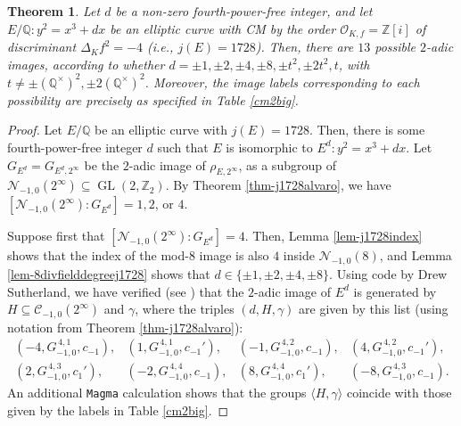 \documentclass[11pt]{amsart}
\newtheorem{thm}[defn]{Theorem}
\theoremstyle{definition}
\newcommand{\Q}{\mathbb Q}
\newcommand{\Z}{\mathbb Z}
\newcommand{\Of}{\mathcal{O}_{K,f}}
\newcommand{\cC}{\mathcal{C}}
\newcommand{\GL}{\operatorname{GL}}
\begin{document}
\begin{thm}\label{j1728ver }\label{thm-j1728}
    Let $d$ be a non-zero fourth-power-free integer, and let $E/\Q: y^2=x^3+dx$ be an elliptic curve with CM by the order $\Of=\Z[i]$ of discriminant $\Delta_K f^2=-4$ (i.e., $j(E)=1728$). Then, there are $13$ possible $2$-adic images, according to whether $d = \pm 1, \pm 2, \pm 4, \pm 8, \pm t^2, \pm 2t^2, t$, with $t\neq \pm (\Q^\times)^2, \pm 2(\Q^\times)^2$. Moreover, the image labels corresponding to each possibility are precisely as specified in Table \ref{cm2big}.
\end{thm}
\begin{proof}
 Let $E/\Q$ be an elliptic curve with $j(E)=1728$. Then, there is some fourth-power-free integer $d$ such that $E$ is isomorphic to  $E^d : y^2=x^3+dx$. Let $G_{E^d}=G_{E^d,2^\infty}$ be the $2$-adic image of $\rho_{E,2^\infty}$, as a subgroup of  $\mathcal{N}_{-1,0}(2^{\infty})\subseteq \GL(2,\Z_2)$. By Theorem \ref{thm-j1728alvaro}, we have $[\mathcal{N}_{-1,0}(2^{\infty}): G_{E^d}]=1,2$, or $4$.
 
 Suppose first that $[\mathcal{N}_{-1,0}(2^{\infty}): G_{E^d}]=4$. Then, Lemma \ref{lem-j1728index} shows that the index of the mod-$8$ image is also $4$ inside $\mathcal{N}_{-1,0}(8)$, and Lemma \ref{lem-8divfielddegreej1728} shows that $d\in \{\pm 1, \pm 2, \pm 4, \pm 8\}.$ Using code by Drew Sutherland, we have verified (see \cite[Example 9.8]{lozano-galoiscm}) that the $2$-adic image of $E^d$ is generated by $H\subseteq \cC_{-1,0}(2^{\infty})$ and $\gamma$, where the triples $(d,H,\gamma)$ are given by this list (using notation from Theorem \ref{thm-j1728alvaro}): 
 $$
 \begin{array}{cccc}
 (-4,G^{\,4,1}_{-1,0},c_{-1}), &%
	 (1,G^{\, 4,1}_{-1,0},c_{-1}'),& %
	   (-1,G^{\,4,2}_{-1,0},c_{-1}), &%
	    (4,G^{\,4,2}_{-1,0},c_{-1}'), %
	    \\
	     (2,G^{\,4,3}_{-1,0},c_{1}'), &%
	(-2,G^{\,4,4}_{-1,0},c_{-1}),& %
	 (8,G^{\,4,4}_{-1,0},c_{1}'),& %
	 (-8,G^{\,4,3}_{-1,0},c_{-1}). %
	\end{array}
	$$ 
 An additional \verb|Magma| calculation shows that the groups $\langle H,\gamma\rangle$ coincide with those given by the labels in Table \ref{cm2big}. 


\end{proof}
\end{document}
